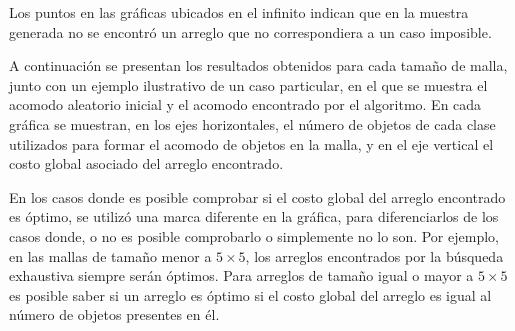 Los puntos en las gráficas ubicados en el infinito indican que en la muestra generada no se encontró un arreglo que no correspondiera a un caso imposible. 

A continuación se presentan los resultados obtenidos para cada tamaño de malla, junto con un ejemplo ilustrativo de un caso particular, en el que se muestra el acomodo aleatorio inicial y el acomodo encontrado por el algoritmo.
En cada gráfica se muestran, en los ejes horizontales, el número de objetos de cada clase utilizados para formar el acomodo de objetos en la malla, y en el eje vertical el costo global asociado del arreglo encontrado.

En los casos donde es posible comprobar si el costo global del arreglo encontrado es óptimo, se utilizó una marca diferente en la gráfica, para diferenciarlos de los casos donde, o no es posible comprobarlo o simplemente no lo son.
Por ejemplo, en las mallas de tamaño menor a $5\times 5$, los arreglos encontrados por la búsqueda exhaustiva siempre serán óptimos.
Para arreglos de tamaño igual o mayor a $5\times 5$ es posible saber si un arreglo es óptimo si el costo global del arreglo es igual al número de objetos presentes en él.

